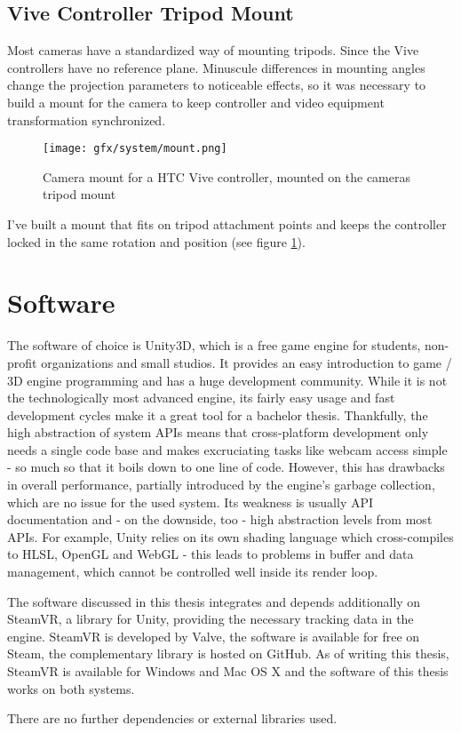 \subsection{Vive Controller Tripod Mount}
Most cameras have a standardized way of mounting tripods. Since the Vive  
controllers have no reference plane. Minuscule differences in mounting angles 
change the projection parameters to noticeable effects, so it was necessary to 
build a mount for the camera to keep controller and video equipment 
transformation synchronized.

\begin{figure}[htb]
	\texttt{[image: gfx/system/mount.png]}
	\caption{Camera mount for a HTC Vive controller, mounted on the cameras 
		tripod mount}
	\label{fig:system:camera-mount}
\end{figure}

I've built a mount that fits on tripod attachment points and keeps the 
controller locked in the same rotation and position (see figure 
\ref{fig:system:camera-mount}).



\section{Software}

The software of choice is Unity3D, which is a free game engine for students, 
non-profit organizations and small studios. It provides an easy introduction to 
game / 3D engine programming and has a huge development community. While it is 
not the technologically most advanced engine, its fairly easy usage and fast 
development cycles make it a great tool for a bachelor thesis.
\newline
Thankfully, the high abstraction of system APIs means that cross-platform 
development only needs a single code base and makes excruciating tasks like 
webcam access simple - so much so that it boils down to one line of code. 
However, this has drawbacks in overall performance, partially introduced by the 
engine's garbage collection, which are no issue for the used system.
\newline
Its weakness is usually API documentation and - on the downside, too - high 
abstraction levels from most APIs. For example, Unity relies on its own shading 
language which cross-compiles to HLSL, OpenGL and WebGL - this leads to 
problems in buffer and data management, which cannot be controlled well inside 
its render loop.

The software discussed in this thesis integrates and depends additionally on 
SteamVR, a library for Unity, providing the necessary tracking data in the 
engine. SteamVR is developed by Valve, the software is available for free on 
Steam, the complementary library is hosted on GitHub. As of writing this 
thesis, SteamVR is available for Windows and Mac OS X and the software of this 
thesis works on both systems. 

There are no further dependencies or external libraries used.
